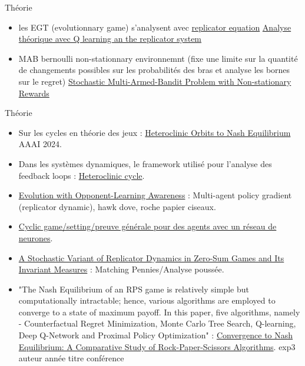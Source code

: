 \documentclass[aspectratio=169,xcolor=dvipsnames]{beamer}
\begin{document}
\begin{frame}{Théorie}

    \begin{itemize}
        \item les EGT (evolutionnary game)  s'analysent avec \href{ https://en.wikipedia.org/wiki/Replicator_equation}{\color{blue} replicator equation}
        \href{https://www.researchgate.net/publication/221454784_A_selection-mutation_model_for_q-learning_in_multi-agent_systems}{ \color{blue} Analyse théorique avec Q learning an the replicator system}
        
        \item MAB bernoulli non-stationnary environnemnt (fixe une limite sur la quantité de changements possibles sur les probabilités des bras et analyse les bornes sur le regret) 
\href{https://proceedings.neurips.cc/paper_files/paper/2014/file/903ce9225fca3e988c2af215d4e544d3-Paper.pdf}{\color{blue} Stochastic Multi-Armed-Bandit Problem
with Non-stationary Rewards}
        \end{itemize}
\end{frame}
\begin{frame}{Théorie}
    \begin{itemize}
        \item Sur les cycles en théorie des jeux : 
        \href{https://arxiv.org/pdf/2305.13619}{\color{blue} Heteroclinic Orbits to Nash Equilibrium} AAAI 2024.
        \item Dans les systèmes dynamiques, le framework utilisé pour l'analyse des feedback loops : 
        \href{https://en.wikipedia.org/wiki/Heteroclinic_cycle}{\color{blue} Heteroclinic cycle}.
        \item \href{https://arxiv.org/abs/2410.17466}{\color{blue} Evolution with Opponent-Learning Awareness} : Multi-agent policy gradient (replicator dynamic), hawk dove, roche papier ciseaux.
        \item \href{https://arxiv.org/abs/1901.08106}{\color{blue} Cyclic game/setting/preuve générale pour des agents avec un réseau de neurones}.
        \item \href{https://www.fields.utoronto.ca/talks/Stochastic-Variant-Replicator-Dynamics-Zero-Sum-Games-and-Its-Invariant-Measures}{\color{blue} A Stochastic Variant of Replicator Dynamics in Zero-Sum Games and Its Invariant Measures} : Matching Pennies/Analyse poussée.
        \item "The Nash Equilibrium of an RPS game is relatively simple but computationally intractable; hence, various algorithms are employed to converge to a state of maximum payoff. In this paper, five algorithms, namely - Counterfactual Regret Minimization, Monte Carlo Tree Search, Q-learning, Deep Q-Network and Proximal Policy Optimization" : 
        \href{https://www.researchgate.net/publication/378246505_Convergence_to_Nash_Equilibrium_A_Comparative_Study_of_Rock-Paper-Scissors_Algorithms}{\color{blue} Convergence to Nash Equilibrium: A Comparative Study of Rock-Paper-Scissors Algorithms}. exp3 auteur année titre conférence
    \end{itemize}
\end{frame}
\end{document}
